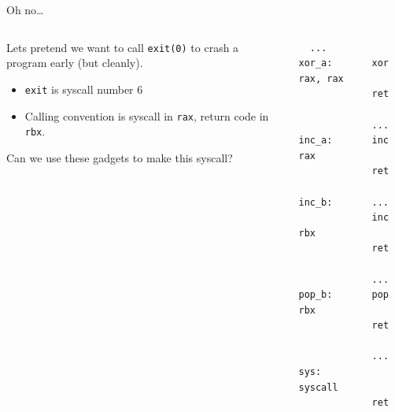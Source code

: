 \documentclass[9pt,aspectratio=169]{beamer}
\begin{document}
\begin{frame}[label={sec:org3fda8a7},fragile]{Oh no\ldots{}}
 \begin{columns}
\begin{column}[t]{0.49\columnwidth}
Lets pretend we want to call \texttt{exit(0)} to crash a program early (but cleanly).
\begin{itemize}
\item \texttt{exit} is syscall number 6
\item Calling convention is syscall in \texttt{rax}, return code in \texttt{rbx}.
\end{itemize}

\begin{block}{Can we use these gadgets to make this syscall?}
\end{block}
\end{column}

\begin{column}[t]{0.49\columnwidth}
\begin{verbatim}
  ...
xor_a:       xor rax, rax
             ret

             ...
inc_a:       inc rax
             ret

inc_b:       ...
             inc rbx
             ret

             ...
pop_b:       pop rbx
             ret

             ...
sys:         syscall
             ret
\end{verbatim}
\end{column}
\end{columns}
\end{frame}
\end{document}

